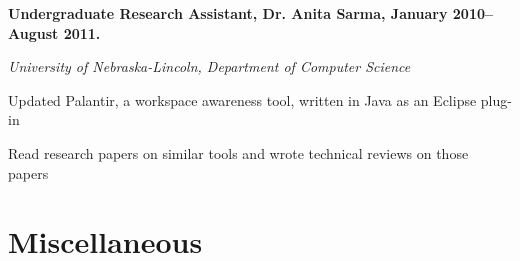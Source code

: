 \documentclass[10pt,letterpaper]{article}
\renewenvironment{itemize}{
  \begin{list}{}{
    \setlength{\leftmargin}{1.5em}
    \setlength{\itemsep}{0.25em}
    \setlength{\parskip}{0pt}
    \setlength{\parsep}{0.25em}
  }
}{
  \end{list}
}
\begin{document}
\begin{itemize}
\item \textbf{Undergraduate Research Assistant, Dr. Anita Sarma, January 2010--August 2011.}
\item \emph{University of Nebraska-Lincoln, Department of Computer Science}
	\begin{itemize}
	\item Updated Palantir, a workspace awareness tool, written in Java as an Eclipse plug-in
	\item Read research papers on similar tools and wrote technical reviews on those papers
	\end{itemize}
\end{itemize}



\section*{Miscellaneous}
\end{document}
